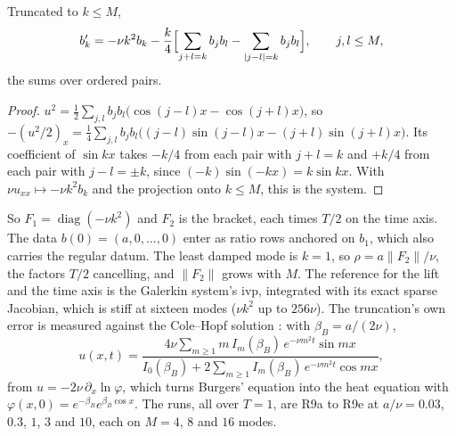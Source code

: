 \begin{proposition}
\label{prop:burgers-galerkin}
Truncated to $k\le M$,
\begin{equation}
    b_k'=-\nu k^2b_k-\frac k4\Bigl[\sum_{j+l=k}b_jb_l-\sum_{|j-l|=k}b_jb_l\Bigr],\qquad j,l\le M,
\end{equation}
the sums over ordered pairs.
\end{proposition}
\begin{proof}
$u^2=\tfrac12\sum_{j,l}b_jb_l\bigl(\cos(j-l)x-\cos(j+l)x\bigr)$, so $-(u^2/2)_x=\tfrac14\sum_{j,l}b_jb_l\bigl((j-l)\sin(j-l)x-(j+l)\sin(j+l)x\bigr)$. Its coefficient of $\sin kx$ takes $-k/4$ from each pair with $j+l=k$ and $+k/4$ from each pair with $j-l=\pm k$, since $(-k)\sin(-kx)=k\sin kx$. With $\nu u_{xx}\mapsto-\nu k^2b_k$ and the projection onto $k\le M$, this is the system.
\end{proof}
So $F_1=\operatorname{diag}(-\nu k^2)$ and $F_2$ is the bracket, each times $T/2$ on the time axis. The data $b(0)=(a,0,\dots,0)$ enter as ratio rows anchored on $b_1$, which also carries the regular datum. The least damped mode is $k=1$, so $\rho=a\|F_2\|/\nu$, the factors $T/2$ cancelling, and $\|F_2\|$ grows with $M$. The reference for the lift and the time axis is the Galerkin system's \gls{ivp}, integrated with its exact sparse Jacobian, which is stiff at sixteen modes ($\nu k^2$ up to $256\nu$). The truncation's own error is measured against the Cole--Hopf solution \cite{hopf1950burgers,cole1951burgers}: with $\beta_B=a/(2\nu)$,
\begin{equation}
    u(x,t)=\frac{4\nu\sum_{m\ge1}m\,I_m(\beta_B)\,e^{-\nu m^2t}\sin mx}{I_0(\beta_B)+2\sum_{m\ge1}I_m(\beta_B)\,e^{-\nu m^2t}\cos mx},
\end{equation}
from $u=-2\nu\,\partial_x\ln\varphi$, which turns Burgers' equation into the heat equation with $\varphi(x,0)=e^{-\beta_B}e^{\beta_B\cos x}$. The runs, all over $T=1$, are R9a to R9e at $a/\nu=0.03$, $0.3$, $1$, $3$ and $10$, each on $M=4$, $8$ and $16$ modes.

